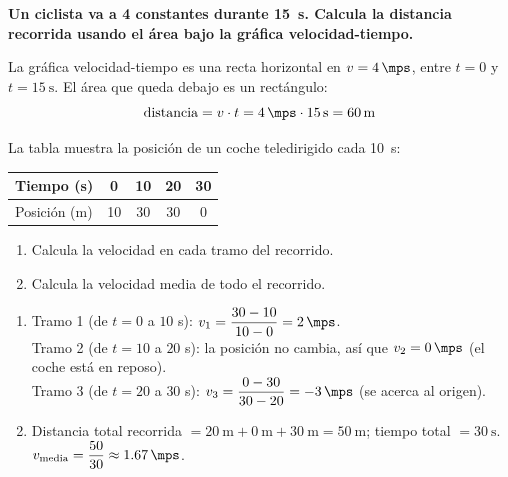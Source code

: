 \begin{example}
    \textbf{Un ciclista va a \qty{4}{\mps} constantes durante \qty{15}{\s}. Calcula la distancia recorrida usando el área bajo la gráfica velocidad-tiempo.}

    La gráfica velocidad-tiempo es una recta horizontal en \(v = \qty{4}{\mps}\), entre \(t=0\) y \(t=\qty{15}{\s}\). El área que queda debajo es un rectángulo:
    \begin{equation*}
        \text{distancia} = v \cdot t = \qty{4}{\mps} \cdot \qty{15}{\s} = \qty{60}{\m}
    \end{equation*}
\end{example}

\begin{exercise}
    La tabla muestra la posición de un coche teledirigido cada \qty{10}{\s}:
    \begin{center}
        \begin{tabular}{lcccc}
            \toprule
            Tiempo (s) & 0 & 10 & 20 & 30 \\
            \midrule
            Posición (m) & 10 & 30 & 30 & 0 \\
            \bottomrule
        \end{tabular}
    \end{center}
    \begin{enumerate}[label=\letraminuscula]
        \item Calcula la velocidad en cada tramo del recorrido.
        \item Calcula la velocidad media de todo el recorrido.
    \end{enumerate}
    \begin{solu}
        \begin{enumerate}[label=\alph*)]
            \item Tramo 1 (de \(t=0\) a \(10\) s): \(v_1 = \dfrac{30-10}{10-0} = \qty{2}{\mps}\). \\
            Tramo 2 (de \(t=10\) a \(20\) s): la posición no cambia, así que \(v_2 = \qty{0}{\mps}\) (el coche está en reposo). \\
            Tramo 3 (de \(t=20\) a \(30\) s): \(v_3 = \dfrac{0-30}{30-20} = \qty{-3}{\mps}\) (se acerca al origen).
            \item Distancia total recorrida \(= \qty{20}{\m} + \qty{0}{\m} + \qty{30}{\m} = \qty{50}{\m}\); tiempo total \(= \qty{30}{\s}\). \\
            \(v_{\text{media}} = \dfrac{50}{30} \approx \qty{1.67}{\mps}\).
        \end{enumerate}
    \end{solu}
\end{exercise}

